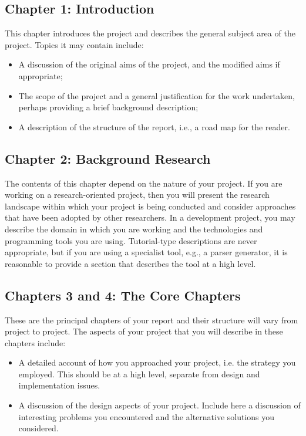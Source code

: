 \documentclass[]{final_report}
\begin{document}
\subsection{Chapter 1: Introduction}

This chapter introduces the project and describes the general subject area of the project. Topics it may contain include:

\begin{itemize}
\item A discussion of the original aims of the project, and the modified aims if appropriate;
\item The scope of the project and a general justification for the work undertaken, perhaps providing a brief background description;
\item A description of the structure of the report, i.e., a road map for the reader.
\end{itemize}

\subsection{Chapter 2: Background Research}

The contents of this chapter depend on the nature of your project. If you are working on a research-oriented project, then you will present the research landscape within which your project is being conducted and consider approaches that have been adopted by other researchers. In a development project, you may describe the domain in which you are working and the technologies and programming tools you are using. Tutorial-type descriptions are never appropriate, but if you are using a specialist tool, e.g., a parser generator, it is reasonable to provide a section that describes the tool at a high level.


\subsection{Chapters 3 and 4: The Core Chapters}

These are the principal chapters of your report and their structure will vary from project to project. The aspects of your project that you will describe in these chapters include:

\begin{itemize}
\item A detailed account of how you approached your project, i.e. the strategy you employed. This should be at a high level, separate from design and implementation issues.
\item A discussion of the design aspects of your project. Include here a discussion of interesting problems you encountered and the alternative solutions you considered.
\end{itemize}
\end{document}
